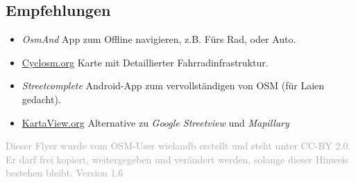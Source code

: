 \documentclass[10pt,foldmark,notumble]{leaflet}
\newcommand{\myhy}[1]{{\color{blue}\setulcolor{blue}\ul{#1}}}
\begin{document}
    \subsection{Empfehlungen}
    \begin{itemize}[noitemsep,topsep=0pt]
        \item \textit{OsmAnd} App zum Offline navigieren, z.B. Fürs Rad, oder Auto.
        \item \myhy{Cyclosm.org} Karte mit Detaillierter Fahrradinfrastruktur.
        \item \textit{Streetcomplete} Android-App zum vervollständigen von OSM (für Laien gedacht).
        \item \myhy{KartaView.org} Alternative zu \textit{Google Streetview} und \textit{Mapillary}
    \end{itemize}

    \textcolor{darkgray}{\scriptsize Dieser Flyer wurde vom OSM-User wielandb erstellt und steht unter CC-BY 2.0.
    Er darf frei kopiert, weitergegeben und verändert werden, solange dieser Hinweis bestehen bleibt.
    Version 1.6}
\end{document}

